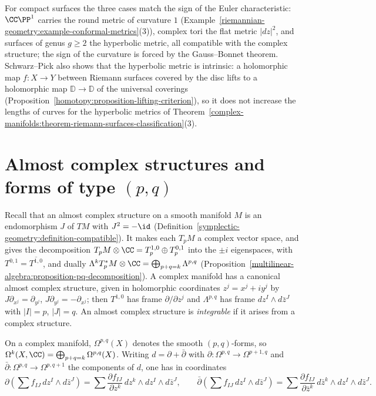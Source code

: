 \begin{remark}\label{complex-manifolds:remark-uniformisation-metrics}
For compact surfaces the three cases match the sign of the Euler characteristic: $\CC\PP^1$ carries the round metric of curvature $1$ (Example~\ref{riemannian-geometry:example-conformal-metrics}(3)),
complex tori the flat metric $|dz|^2$, and surfaces of genus $g \geq 2$ the hyperbolic metric, all compatible with the complex structure; the sign of the curvature is forced by the
Gauss--Bonnet theorem. Schwarz--Pick also shows that the hyperbolic metric is intrinsic: a holomorphic map $f \colon X \to Y$ between Riemann surfaces covered by the disc
lifts to a holomorphic map $\mathbb{D} \to \mathbb{D}$ of the universal coverings (Proposition~\ref{homotopy:proposition-lifting-criterion}), so it does not increase the lengths of
curves for the hyperbolic metrics of Theorem~\ref{complex-manifolds:theorem-riemann-surfaces-classification}(3).
\end{remark}

\section{Almost complex structures and forms of type $(p,q)$}\label{complex-manifolds:section-pq}

\begin{definition}\label{complex-manifolds:definition-almost-complex}
Recall that an almost complex structure on a smooth manifold $M$ is an endomorphism $J$ of $TM$ with $J^2 = -\id$ (Definition~\ref{symplectic-geometry:definition-compatible}). It makes each $T_pM$ a complex vector space, and gives the decomposition
$T_pM \otimes \CC = T^{1,0}_p \oplus T^{0,1}_p$ into the $\pm i$ eigenspaces, with $T^{0,1} = \overline{T^{1,0}}$, and dually
$\Lambda^k T^*_pM \otimes \CC = \bigoplus_{p+q=k}\Lambda^{p,q}$ (Proposition~\ref{multilinear-algebra:proposition-pq-decomposition}). A complex manifold has a canonical almost complex structure, given in
holomorphic coordinates $z^j = x^j + iy^j$ by $J\partial_{x^j} = \partial_{y^j}$, $J\partial_{y^j} = -\partial_{x^j}$; then $T^{1,0}$ has frame $\partial/\partial z^j$ and $\Lambda^{p,q}$ has frame
$dz^I \wedge d\bar z^J$ with $|I| = p$, $|J| = q$. An almost complex structure is \emph{integrable} if it arises from a complex structure.
\end{definition}

\begin{definition}\label{complex-manifolds:definition-dbar}
On a complex manifold, $\Omega^{p,q}(X)$ denotes the smooth $(p,q)$-forms, so $\Omega^k(X, \CC) = \bigoplus_{p+q=k}\Omega^{p,q}(X)$. Writing $d = \partial + \bar\partial$ with
$\partial \colon \Omega^{p,q} \to \Omega^{p+1,q}$ and $\bar\partial \colon \Omega^{p,q} \to \Omega^{p,q+1}$ the components of $d$, one has in coordinates
\[
\partial\left(\sum f_{IJ}\,dz^I \wedge d\bar z^J\right) = \sum\frac{\partial f_{IJ}}{\partial z^k}\,dz^k \wedge dz^I \wedge d\bar z^J, \qquad
\bar\partial\left(\sum f_{IJ}\,dz^I \wedge d\bar z^J\right) = \sum\frac{\partial f_{IJ}}{\partial\bar z^k}\,d\bar z^k \wedge dz^I \wedge d\bar z^J .
\]
\end{definition}

